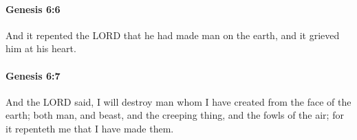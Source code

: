 		\paragraph{Genesis 6:6} %
			\label{GENESIS-6-6}

			And it repented the LORD that he had made man on the earth, and it grieved him at his heart.


		\paragraph{Genesis 6:7} %
			\label{GENESIS-6-7}

			And the LORD said, I will destroy man whom I have created from the face of the earth; both man, and beast, and the creeping thing, and the fowls of the air; for it repenteth me that I have made them.


